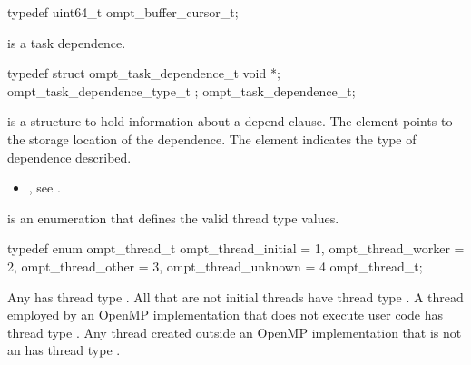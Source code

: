 \begin{ccppspecific}
\begin{omptOther}
typedef uint64_t ompt_buffer_cursor_t;
\end{omptOther}
\end{ccppspecific}





\label{sec:ompt_task_dependence_t}
 is a task dependence.


\begin{ccppspecific}
\begin{omptOther}
typedef struct ompt_task_dependence_t {
  void *;
  ompt_task_dependence_type_t ;
} ompt_task_dependence_t;
\end{omptOther}
\end{ccppspecific}


\descr
{} is a structure to hold information
about a depend clause.
The element  points to the storage location of the dependence.
The element  indicates the type of dependence described.

\crossreferences
\begin{itemize}
\item {}, see
.
\end{itemize}



\label{sec:ompt_thread_t}
 is an enumeration that defines the valid thread type values.


\begin{ccppspecific}
\begin{omptEnum}
typedef enum ompt_thread_t {
  ompt_thread_initial                 = 1,
  ompt_thread_worker                  = 2,
  ompt_thread_other                   = 3,
  ompt_thread_unknown                 = 4
} ompt_thread_t;
\end{omptEnum}
\end{ccppspecific}


Any  has thread type .
All  that are not initial threads have thread
type .  A thread employed by an OpenMP
implementation that does not execute user code has thread type
.  Any thread created outside an OpenMP
implementation that is not an  has thread type
.

